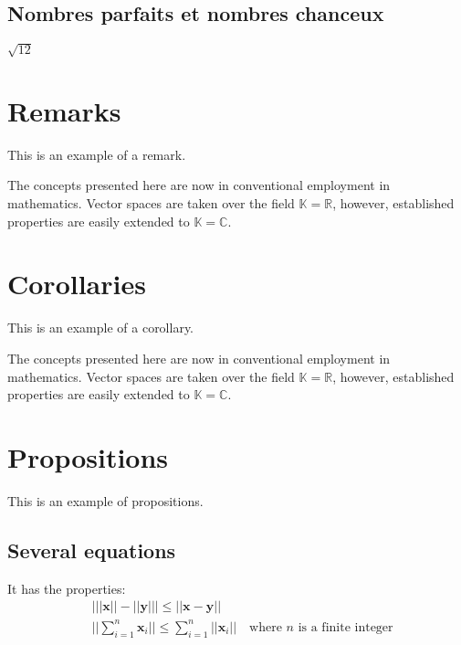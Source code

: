 \documentclass[11pt,fleqn]{book} %
\begin{document}
\subsection{Nombres parfaits et nombres chanceux}
\begin{exercise}
$\sqrt{12}$
\end{exercise}

\section{Remarks}

This is an example of a remark.

\begin{remark}
The concepts presented here are now in conventional employment in mathematics. Vector spaces are taken over the field $\mathbb{K}=\mathbb{R}$, however, established properties are easily extended to $\mathbb{K}=\mathbb{C}$.
\end{remark}


\section{Corollaries}

This is an example of a corollary.

\begin{corollary}
The concepts presented here are now in conventional employment in mathematics. Vector spaces are taken over the field $\mathbb{K}=\mathbb{R}$, however, established properties are easily extended to $\mathbb{K}=\mathbb{C}$.
\end{corollary}


\section{Propositions}

This is an example of propositions.

\subsection{Several equations}

\begin{proposition}
It has the properties:
\begin{align}
& \big| ||\mathbf{x}|| - ||\mathbf{y}|| \big|\leq || \mathbf{x}- \mathbf{y}||\\
&  ||\sum_{i=1}^n\mathbf{x}_i||\leq \sum_{i=1}^n||\mathbf{x}_i||\quad\text{where $n$ is a finite integer}
\end{align}
\end{proposition}
\end{document}
